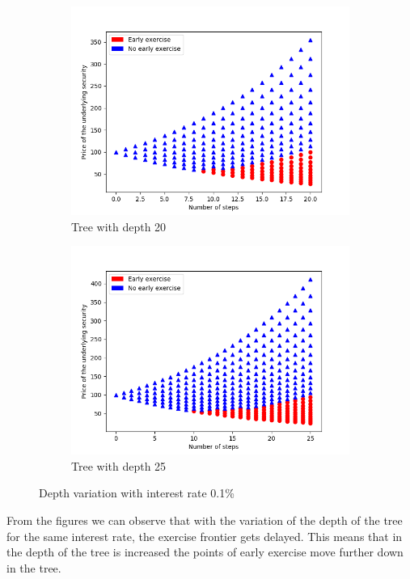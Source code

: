 \documentclass[12pt]{report}
\begin{document}
\begin{small}
\begin{figure}[H]
		
		\begin{subfigure}{.5\textwidth}
			\centering
			\includegraphics[width=.8\linewidth]{plots/n_20_r_001.png}  
			\caption{Tree with depth 20}
			\label{fig2:sub-third}
		\end{subfigure}
		\begin{subfigure}{.5\textwidth}
			\centering
			\includegraphics[width=.8\linewidth]{plots/n_25_r_001.png}  
			\caption{Tree with depth 25}
			\label{fig2:sub-fourth}
		\end{subfigure}
		\caption{Depth variation with interest rate 0.1\%}
		\label{fig:fig2}
	\end{figure}
\end{small}

From the figures we can observe that with the variation of the depth of the tree for the same interest rate, the exercise frontier gets delayed. This means that in the depth of the tree is increased the points of early exercise move further down in the tree.
\end{document}
